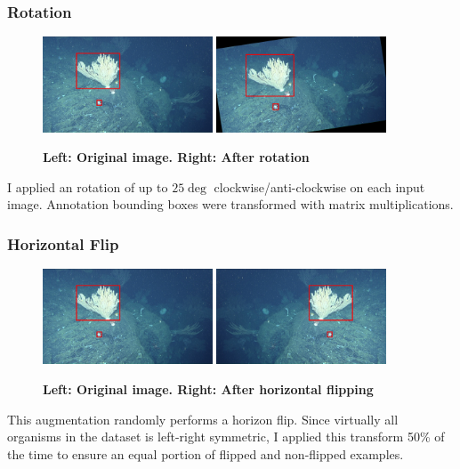 \documentclass[12pt,a4paper,twoside,openany]{report}
\begin{document}
\subsubsection{Rotation}
\begin{figure}[H]
    \centering
    \includegraphics[width=0.45\textwidth]{figs/implementation/aug/before.png}
    \hfill
    \includegraphics[width=0.45\textwidth]{figs/implementation/aug/rot.png}
    \caption{\textbf{Left: Original image. Right: After rotation}}
    \label{fig:aug_rotate}
\end{figure}
I applied an rotation of up to $25\deg$ clockwise/anti-clockwise on each input image. Annotation bounding boxes were transformed with matrix multiplications.
{
\subsubsection{Horizontal Flip}
\begin{figure}[H]
    \centering
    \includegraphics[width=0.45\textwidth]{figs/implementation/aug/before.png}
    \hfill
    \includegraphics[width=0.45\textwidth]{figs/implementation/aug/flip.png}
    \caption{\textbf{Left: Original image. Right: After horizontal flipping}}
    \label{fig:aug_flip}
\end{figure}
This augmentation randomly performs a horizon flip. Since virtually all organisms in the dataset is left-right symmetric, I applied this transform 50\% of the time to ensure an equal portion of flipped and non-flipped examples.
}
\end{document}

